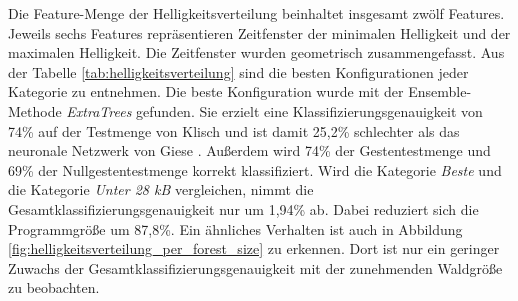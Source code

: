 Die Feature-Menge der Helligkeitsverteilung beinhaltet insgesamt zwölf Features. Jeweils sechs Features repräsentieren Zeitfenster der minimalen Helligkeit und der maximalen Helligkeit. Die Zeitfenster wurden
geometrisch zusammengefasst.
\newline
\newline
Aus der Tabelle \ref{tab:helligkeitsverteilung} sind die besten Konfigurationen jeder Kategorie zu entnehmen. Die beste Konfiguration wurde mit der Ensemble-Methode \textit{ExtraTrees} gefunden.
Sie erzielt eine Klassifizierungsgenauigkeit von 74\% auf der Testmenge von Klisch und ist damit 25,2\% schlechter als das neuronale Netzwerk von Giese \cite{gieseThesis}. Außerdem wird 74\% der Gestentestmenge
und 69\% der Nullgestentestmenge korrekt klassifiziert.
\newline
\newline
Wird die Kategorie \textit{Beste} und die Kategorie \textit{Unter 28 kB} vergleichen, nimmt die Gesamtklassifizierungsgenauigkeit nur um 1,94\% ab. Dabei reduziert sich die Programmgröße um 87,8\%.
Ein ähnliches Verhalten ist auch in Abbildung \ref{fig:helligkeitsverteilung_per_forest_size} zu erkennen. Dort ist nur ein geringer Zuwachs der Gesamtklassifizierungsgenauigkeit mit der zunehmenden
Waldgröße zu beobachten.
